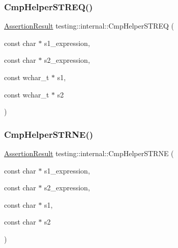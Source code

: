 \subsubsection{\texorpdfstring{Cmp\+Helper\+S\+T\+R\+E\+Q()}{CmpHelperSTREQ()}\hspace{0.1cm}{\footnotesize\ttfamily [2/2]}}
{\footnotesize\ttfamily \hyperlink{classtesting_1_1_assertion_result}{Assertion\+Result} testing\+::internal\+::\+Cmp\+Helper\+S\+T\+R\+EQ (\begin{DoxyParamCaption}\item[{const char $\ast$}]{s1\+\_\+expression,  }\item[{const char $\ast$}]{s2\+\_\+expression,  }\item[{const wchar\+\_\+t $\ast$}]{s1,  }\item[{const wchar\+\_\+t $\ast$}]{s2 }\end{DoxyParamCaption})}

\mbox{\label{namespacetesting_1_1internal_af2d31c77ce73e1003a64bd7ca3564bbe}} 
\subsubsection{\texorpdfstring{Cmp\+Helper\+S\+T\+R\+N\+E()}{CmpHelperSTRNE()}\hspace{0.1cm}{\footnotesize\ttfamily [1/2]}}
{\footnotesize\ttfamily \hyperlink{classtesting_1_1_assertion_result}{Assertion\+Result} testing\+::internal\+::\+Cmp\+Helper\+S\+T\+R\+NE (\begin{DoxyParamCaption}\item[{const char $\ast$}]{s1\+\_\+expression,  }\item[{const char $\ast$}]{s2\+\_\+expression,  }\item[{const char $\ast$}]{s1,  }\item[{const char $\ast$}]{s2 }\end{DoxyParamCaption})}

\mbox{\label{namespacetesting_1_1internal_a415a953647bbc9469f062dc966061efb}} 
